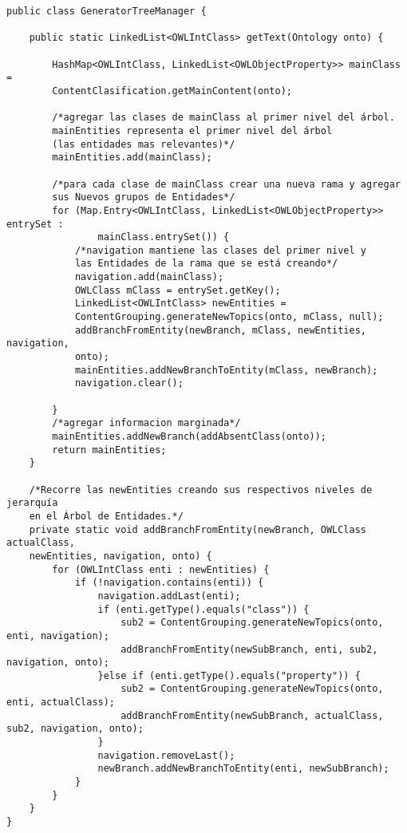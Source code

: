 \begin{verbatim}
public class GeneratorTreeManager {

    public static LinkedList<OWLIntClass> getText(Ontology onto) {

        HashMap<OWLIntClass, LinkedList<OWLObjectProperty>> mainClass =
        ContentClasification.getMainContent(onto);
        
        /*agregar las clases de mainClass al primer nivel del árbol. 
        mainEntities representa el primer nivel del árbol 
        (las entidades mas relevantes)*/
        mainEntities.add(mainClass);
        
        /*para cada clase de mainClass crear una nueva rama y agregar 
        sus Nuevos grupos de Entidades*/
        for (Map.Entry<OWLIntClass, LinkedList<OWLObjectProperty>> entrySet : 
                mainClass.entrySet()) {
            /*navigation mantiene las clases del primer nivel y
            las Entidades de la rama que se está creando*/
            navigation.add(mainClass);
            OWLClass mClass = entrySet.getKey();
            LinkedList<OWLIntClass> newEntities =
            ContentGrouping.generateNewTopics(onto, mClass, null);
            addBranchFromEntity(newBranch, mClass, newEntities, navigation,
            onto);
            mainEntities.addNewBranchToEntity(mClass, newBranch);
            navigation.clear();
            
        }
        /*agregar informacion marginada*/
        mainEntities.addNewBranch(addAbsentClass(onto));
        return mainEntities;
    }
    
    /*Recorre las newEntities creando sus respectivos niveles de jerarquía 
    en el Árbol de Entidades.*/
    private static void addBranchFromEntity(newBranch, OWLClass actualClass,
    newEntities, navigation, onto) {
        for (OWLIntClass enti : newEntities) {
            if (!navigation.contains(enti)) {
                navigation.addLast(enti);
                if (enti.getType().equals("class")) {
                    sub2 = ContentGrouping.generateNewTopics(onto, enti, navigation);
                    addBranchFromEntity(newSubBranch, enti, sub2, navigation, onto);
                }else if (enti.getType().equals("property")) {
                    sub2 = ContentGrouping.generateNewTopics(onto, enti, actualClass);
                    addBranchFromEntity(newSubBranch, actualClass, sub2, navigation, onto);
                }
                navigation.removeLast();
                newBranch.addNewBranchToEntity(enti, newSubBranch);
            }
        }
    }
}
\end{verbatim}


